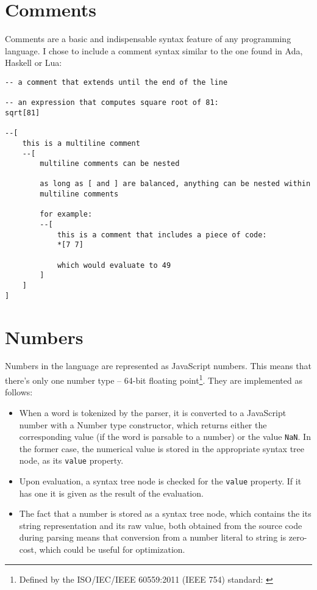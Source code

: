 \section{Comments}\label{sub:comments}
Comments are a basic and indispensable syntax feature of any programming language. I chose to include a comment syntax similar to the one found in Ada, Haskell or Lua:
\begin{lstlisting}
-- a comment that extends until the end of the line

-- an expression that computes square root of 81:
sqrt[81]

--[
    this is a multiline comment
    --[
        multiline comments can be nested
        
        as long as [ and ] are balanced, anything can be nested within
        multiline comments
        
        for example:
        --[
            this is a comment that includes a piece of code:
            *[7 7]
            
            which would evaluate to 49
        ]
    ]
]
\end{lstlisting}

\section{Numbers}
Numbers in the language are represented as JavaScript numbers. This means that
there's only one number type -- 64-bit floating point\footnote{Defined by the
  ISO/IEC/IEEE 60559:2011 (IEEE 754) standard:
  \cite{60559_2011, js_numbers}}. They are implemented as follows:
\begin{itemize}
    \item When a word is tokenized by the parser, it is converted to a
      JavaScript number with a Number type constructor, which returns either the
      corresponding value (if the word is parsable to a number) or the value
      \texttt{NaN}. In the former case, the numerical value is stored in the
      appropriate syntax tree node, as its \texttt{value} property.
    \item Upon evaluation, a syntax tree node is checked for the \texttt{value}
      property. If it has one it is given as the result of the evaluation.
    \item The fact that a number is stored as a syntax tree node, which contains
      the its string representation and its raw value, both obtained from the
      source code during parsing means that conversion from a number literal to
      string is zero-cost, which could be useful for optimization.
\end{itemize}


